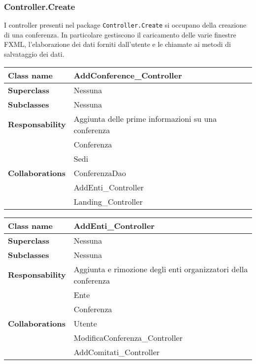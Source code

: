 \subsubsection{Controller.Create}
I controller presenti nel package \texttt{Controller.Create} si occupano della creazione di una conferenza. In particolare gestiscono il caricamento delle varie finestre FXML, l'elaborazione dei dati forniti dall'utente e le chiamate ai metodi di salvataggio dei dati.
\begin{table}[h!]
    \begin{tabular}{|l|l|}
        \hline 
        \textbf{Class name} & AddConference\_Controller
        \\ \hline
        \textbf{Superclass} & Nessuna
        \\ \hline
        \multirow{1}{*}{\textbf{Subclasses}} & Nessuna
        \\ \hline
        \textbf{Responsability} & Aggiunta delle prime informazioni su una conferenza
        \\ \hline
        \multirow{5}{*}{\textbf{Collaborations}} & Conferenza \\
		& Sedi \\
		& ConferenzaDao \\
		& AddEnti\_Controller \\
		& Landing\_Controller
        \\ \hline
    \end{tabular}
\end{table}

\begin{table}[h!]
	\begin{tabular}{|l|l|}
		\hline 
		\textbf{Class name} & AddEnti\_Controller
		\\ \hline
		\textbf{Superclass} & Nessuna
		\\ \hline
		\multirow{1}{*}{\textbf{Subclasses}} & Nessuna
		\\ \hline
		\textbf{Responsability} & Aggiunta e rimozione degli enti organizzatori della conferenza
		\\ \hline
		\multirow{5}{*}{\textbf{Collaborations}} & Ente \\
		& Conferenza\\
		& Utente\\
		& ModificaConferenza\_Controller\\
		& AddComitati\_Controller
		\\ \hline
	\end{tabular}
\end{table}

